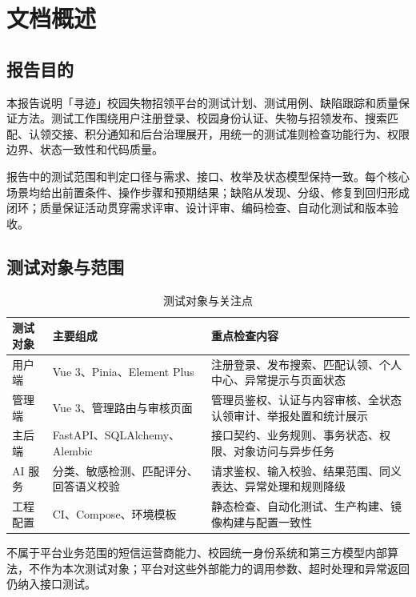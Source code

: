 \section{文档概述}

\subsection{报告目的}

本报告说明「寻迹」校园失物招领平台的测试计划、测试用例、缺陷跟踪和质量保证方法。测试工作围绕用户注册登录、校园身份认证、失物与招领发布、搜索匹配、认领交接、积分通知和后台治理展开，用统一的测试准则检查功能行为、权限边界、状态一致性和代码质量。

报告中的测试范围和判定口径与需求、接口、枚举及状态模型保持一致。每个核心场景均给出前置条件、操作步骤和预期结果；缺陷从发现、分级、修复到回归形成闭环；质量保证活动贯穿需求评审、设计评审、编码检查、自动化测试和版本验收。

\subsection{测试对象与范围}

\begin{table}[H]
  \centering
  \caption{测试对象与关注点}
  \begin{tabularx}{\textwidth}{L{2.7cm}L{3.1cm}Y}
    \toprule
    测试对象 & 主要组成 & 重点检查内容 \\
    \midrule
    用户端 & Vue 3、Pinia、Element Plus & 注册登录、发布搜索、匹配认领、个人中心、异常提示与页面状态 \\
    管理端 & Vue 3、管理路由与审核页面 & 管理员鉴权、认证与内容审核、全状态认领审计、举报处置和统计展示 \\
    主后端 & FastAPI、SQLAlchemy、Alembic & 接口契约、业务规则、事务状态、权限、对象访问与异步任务 \\
    AI 服务 & 分类、敏感检测、匹配评分、回答语义校验 & 请求鉴权、输入校验、结果范围、同义表达、异常处理和规则降级 \\
    工程配置 & CI、Compose、环境模板 & 静态检查、自动化测试、生产构建、镜像构建与配置一致性 \\
    \bottomrule
  \end{tabularx}
\end{table}

不属于平台业务范围的短信运营商能力、校园统一身份系统和第三方模型内部算法，不作为本次测试对象；平台对这些外部能力的调用参数、超时处理和异常返回仍纳入接口测试。

